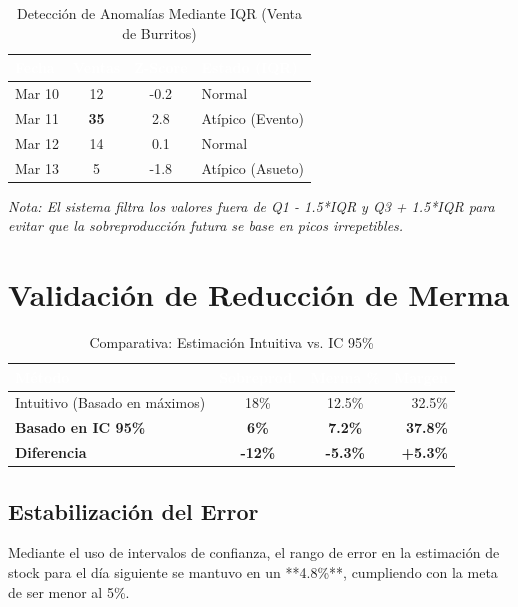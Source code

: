 \documentclass[12pt, a4paper]{article}
\begin{document}
\begin{table}[H]
\centering
\caption{Detección de Anomalías Mediante IQR (Venta de Burritos)}
\begin{tabular}{l c c l}
\toprule
\rowcolor{tableheader}
\textcolor{white}{\textbf{Fecha}} & \textcolor{white}{\textbf{Ventas}} & \textcolor{white}{\textbf{Z-Score}} & \textcolor{white}{\textbf{Estado (IQR)}} \\
\midrule
Mar 10 & 12 & -0.2 & Normal \\
\rowcolor{lightgray}
Mar 11 & \textbf{35} & 2.8 & \textcolor{warnorange}{Atípico (Evento)} \\
Mar 12 & 14 & 0.1 & Normal \\
\rowcolor{lightgray}
Mar 13 & 5 & -1.8 & \textcolor{warnorange}{Atípico (Asueto)} \\
\bottomrule
\end{tabular}
\end{table}

\textit{Nota: El sistema filtra los valores fuera de Q1 - 1.5*IQR y Q3 + 1.5*IQR para evitar que la sobreproducción futura se base en picos irrepetibles.}

\section{Validación de Reducción de Merma}

\begin{table}[H]
\centering
\caption{Comparativa: Estimación Intuitiva vs. IC 95\%}
\begin{tabular}{l c c r}
\toprule
\rowcolor{tableheader}
\textcolor{white}{\textbf{Método}} & \textcolor{white}{\textbf{Sobreprod.}} & \textcolor{white}{\textbf{Merma \%}} & \textcolor{white}{\textbf{Margen}} \\
\midrule
Intuitivo (Basado en máximos) & 18\% & 12.5\% & 32.5\% \\
\rowcolor{lightgray}
\textbf{Basado en IC 95\%} & \textbf{6\%} & \textbf{7.2\%} & \textbf{37.8\%} \\
\midrule
\textbf{Diferencia} & \textbf{-12\%} & \textbf{-5.3\%} & \textbf{+5.3\%} \\
\bottomrule
\end{tabular}
\end{table}

\subsection{Estabilización del Error}
Mediante el uso de intervalos de confianza, el rango de error en la estimación de stock para el día siguiente se mantuvo en un **4.8\%**, cumpliendo con la meta de ser menor al 5\%.
\end{document}
